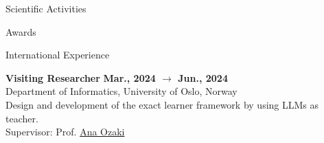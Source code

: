\documentclass{resume} %
\begin{document}
\begin{rSection}{Scientific Activities}
\begin{rSubsection2}{Awards}
        \end{rSubsection2}


        \begin{rSubsection2}{International Experience}

            \item\textbf{ Visiting Researcher }\hfill \textbf{Mar., 2024 $\rightarrow$ Jun., 2024}
            \\Department of Informatics, University of Oslo, Norway
            \\Design and development of the exact learner framework by using LLMs as teacher.
            \\Supervisor: Prof. \href{mailto:anaoz@ifi.uio.no}{Ana Ozaki}

        \end{rSubsection2}

    \end{rSection}


\end{document}

